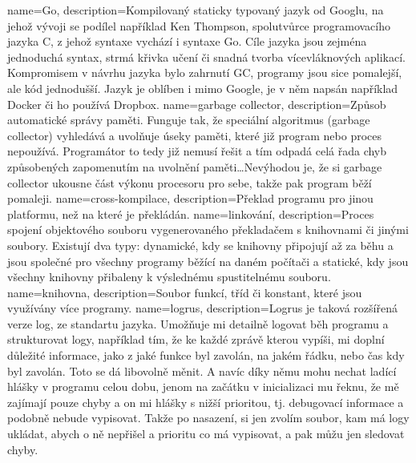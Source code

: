 {
  name={Go},
  description={Kompilovaný staticky typovaný jazyk od Googlu, na jehož vývoji se podílel například Ken Thompson, 
    spolutvůrce programovacího jazyka C, z jehož syntaxe vychází i syntaxe Go. Cíle jazyka jsou zejména jednoduchá 
    syntax, strmá křivka učení či snadná tvorba vícevláknových aplikací. Kompromisem v návrhu jazyka bylo zahrnutí 
    \gls{GC}, programy jsou sice pomalejší, ale kód jednodušší. Jazyk je oblíben i mimo Google, je v něm napsán 
  například Docker či ho používá Dropbox. \parencite{wiki:go}}
}
{
  name={garbage collector},
  description={Způsob automatické správy paměti. Funguje tak, že speciální algoritmus (garbage collector) vyhledává 
    a uvolňuje úseky paměti, které již program nebo proces nepoužívá. Programátor to tedy již nemusí řešit a tím odpadá 
    celá řada chyb způsobených zapomenutím na uvolnění paměti\ldots Nevýhodou je, že si garbage collector ukousne část 
  výkonu procesoru pro sebe, takže pak program běží pomaleji. \parencite{wiki:gc}}
}
{
  name={cross-kompilace},
  description={Překlad programu pro jinou platformu, než na které je překládán. \parencite{wiki:cross}}
}
{
  name={linkování},
  description={Proces spojení objektového souboru vygenerovaného překladačem s knihovnami či jinými soubory. Existují 
  dva typy: dynamické, kdy se knihovny připojují až za běhu a jsou společné pro všechny programy běžící na daném 
počítači a statické, kdy jsou všechny knihovny přibaleny k výslednému spustitelnému souboru. \parencite{wiki:link}}
}
{
  name={knihovna},
  description={Soubor funkcí, tříd či konstant, které jsou využívány více programy. \parencite{wiki:knihovna}}
}
{
  name={logrus},
  description={Logrus je taková rozšířená verze  log, ze standartu jazyka. Umožňuje mi 
    detailně logovat běh programu a strukturovat logy, například tím, že ke každé zprávě kterou vypíši, mi doplní 
    důležité informace, jako z jaké funkce byl zavolán, na jakém řádku, nebo čas kdy byl zavolán. Toto se dá libovolně 
    měnit. A navíc díky němu mohu nechat ladící hlášky v programu celou dobu, jenom na začátku v inicializaci mu řeknu, 
  že mě zajímají pouze chyby a on mi hlášky s nižší prioritou, tj. debugovací informace a podobně nebude vypisovat. 
Takže po nasazení, si jen zvolím soubor, kam má logy ukládat, abych o ně nepřišel a prioritu co má vypisovat, a pak můžu 
jen sledovat chyby. \parencite{github:logrus}}
}
